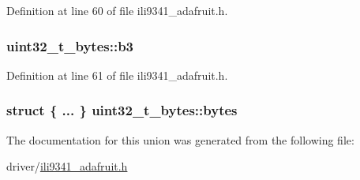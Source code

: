 Definition at line 60 of file ili9341\-\_\-adafruit.\-h.

\hypertarget{unionuint32__t__bytes_abd7739cae59fab7cf712d53f337b378a}{
\subsubsection[{b3}]{ uint32\-\_\-t\-\_\-bytes\-::b3}}\label{unionuint32__t__bytes_abd7739cae59fab7cf712d53f337b378a}


Definition at line 61 of file ili9341\-\_\-adafruit.\-h.

\hypertarget{unionuint32__t__bytes_a50aeebe398ee3b740421f1cc8d8583b8}{
\subsubsection[{bytes}]{\setlength{\rightskip}{0pt plus 5cm}struct \{ ... \}   uint32\-\_\-t\-\_\-bytes\-::bytes}}\label{unionuint32__t__bytes_a50aeebe398ee3b740421f1cc8d8583b8}


The documentation for this union was generated from the following file\-:\begin{DoxyCompactItemize}
\item 
driver/\hyperlink{ili9341__adafruit_8h}{ili9341\-\_\-adafruit.\-h}\end{DoxyCompactItemize}
